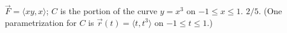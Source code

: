 {$\vec F = \langle xy,x\rangle$; $C$ is the portion of the curve $y=x^3$ on $-1\leq x\leq 1$.
}
{$2/5$. (One parametrization for $C$ is $\vec r(t) = \langle t,t^3\rangle$ on $-1\leq t\leq 1$.)
}
